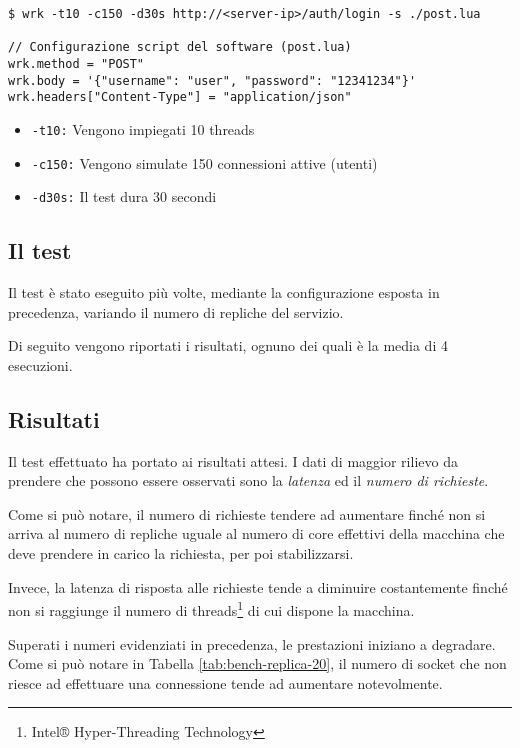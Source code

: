\begin{verbatim}
$ wrk -t10 -c150 -d30s http://<server-ip>/auth/login -s ./post.lua

// Configurazione script del software (post.lua)
wrk.method = "POST"
wrk.body = '{"username": "user", "password": "12341234"}'
wrk.headers["Content-Type"] = "application/json"
\end{verbatim}

\begin{itemize}
    \item \texttt{-t10:} Vengono impiegati 10 threads
    \item \texttt{-c150:} Vengono simulate 150 connessioni attive (utenti)
    \item \texttt{-d30s:} Il test dura 30 secondi
\end{itemize}

%
%
%
\subsection{Il test}

Il test è stato eseguito più volte, mediante la configurazione esposta in precedenza, variando il numero di repliche del servizio.

Di seguito vengono riportati i risultati, ognuno dei quali è la media di 4 esecuzioni.








%
%
%
\subsection{Risultati}

Il test effettuato ha portato ai risultati attesi.
%
I dati di maggior rilievo da prendere che possono essere osservati sono la \emph{latenza} ed il \emph{numero di richieste}.

Come si può notare, il numero di richieste tendere ad aumentare finché non si arriva al numero di repliche uguale al numero di core effettivi della macchina che deve prendere in carico la richiesta, per poi stabilizzarsi.

Invece, la latenza di risposta alle richieste tende a diminuire costantemente finché non si raggiunge il numero di threads\footnote{Intel® Hyper-Threading Technology} di cui dispone la macchina.

Superati i numeri evidenziati in precedenza, le prestazioni iniziano a degradare.
%
Come si può notare in Tabella \ref{tab:bench-replica-20}, il numero di socket che non riesce ad effettuare una connessione tende ad aumentare notevolmente.
